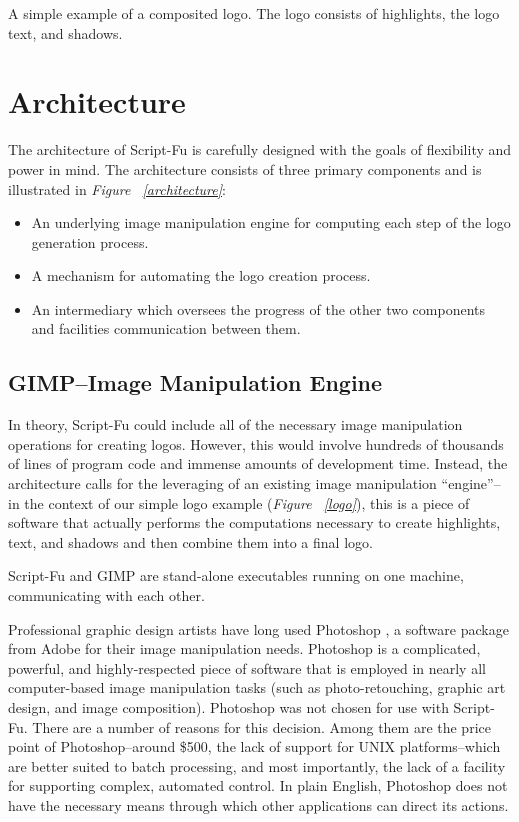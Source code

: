 \documentclass{article}
\makeatletter
\newcommand{\figref}[1]{{\em Figure ~\ref{#1}}\xspace}
\newcommand{\myfigone}[3]{
	\def\@captype{figure}
	\begin{table}
	\bigskip
        \begin{center}
	\leavevmode
	\epsfysize=#2 \epsfbox{#1.eps}
	\caption{#3} \label{#1}
	\end{center}
	\end{table}}
\makeatother
\begin{document}
\myfigone{logo}{6cm}{A simple example of a composited logo.  The logo
consists of highlights, the logo text, and shadows.}

\section{Architecture}

The architecture of Script-Fu is carefully designed with the goals of
flexibility and power in mind.  The architecture consists of three
primary components and is illustrated in \figref{architecture}:
\begin{itemize}
\item An underlying image manipulation engine for computing each step
of the logo generation process.
\item A mechanism for automating the logo creation process.
\item An intermediary which oversees the progress of the other two
components and facilities communication between them.
\end{itemize}

\subsection{GIMP--Image Manipulation Engine}

In theory, Script-Fu could include all of the necessary image
manipulation operations for creating logos.  However, this would
involve hundreds of thousands of lines of program code and immense
amounts of development time.  Instead, the architecture calls for the
leveraging of an existing image manipulation ``engine''--in the
context of our simple logo example (\figref{logo}), this is a piece of
software that actually performs the computations necessary to create
highlights, text, and shadows and then combine them into a final logo.

\myfigone{architecture}{6cm}{Script-Fu and GIMP are stand-alone
executables running on one machine, communicating with each other.}

Professional graphic design artists have long used Photoshop
\cite{photoshop}, a software package from Adobe for their image
manipulation needs.  Photoshop is a complicated, powerful, and
highly-respected piece of software that is employed in nearly all
computer-based image manipulation tasks (such as photo-retouching,
graphic art design, and image composition).  Photoshop was not chosen
for use with Script-Fu.  There are a number of reasons for this
decision.  Among them are the price point of Photoshop--around \$500,
the lack of support for UNIX platforms--which are better suited to
batch processing, and most importantly, the lack of a facility for
supporting complex, automated control.  In plain English, Photoshop
does not have the necessary means through which other applications can
direct its actions.
\end{document}
